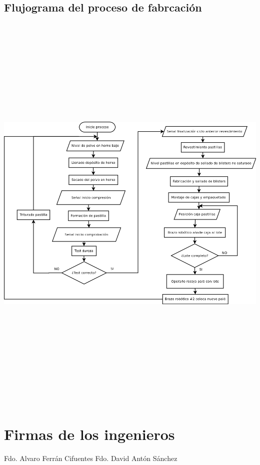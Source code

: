 \subsection{Flujograma del proceso de fabrcación}
\includegraphics[width=15cm,height=20cm,keepaspectratio]{Planos/Flujograma.png}



\newpage\section {Firmas de los ingenieros}
\vspace{5cm}
Fdo. Alvaro Ferrán Cifuentes
\vspace{5cm}\hspace{5cm}
Fdo. David Antón Sánchez

